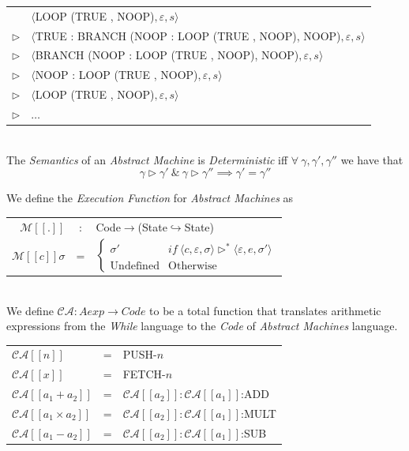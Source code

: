 \documentclass[11pt,a4paper]{article}
\begin{document}
\begin{tabular}{rl}
&$\langle$LOOP (TRUE , NOOP)$,\varepsilon,s\rangle$\\
$\rhd$&$\langle$TRUE : BRANCH (NOOP : LOOP (TRUE , NOOP), NOOP)$,\varepsilon,s\rangle$\\
$\rhd$&$\langle$BRANCH (NOOP : LOOP (TRUE , NOOP), NOOP)$,\varepsilon,s\rangle$\\
$\rhd$&$\langle$NOOP : LOOP (TRUE , NOOP)$,\varepsilon,s\rangle$\\
$\rhd$&$\langle$LOOP (TRUE , NOOP)$,\varepsilon,s\rangle$\\
$\rhd$&$\dots$
\end{tabular}
\\

The \textit{Semantics} of an \textit{Abstract Machine} is \textit{Deterministic} iff $\forall\ \gamma,\gamma',\gamma''$ we have that
$$\gamma\rhd\gamma'\ \&\ \gamma\rhd\gamma''\implies\gamma'=\gamma''$$

We define the \textit{Execution Function} for \textit{Abstract Machines} as\\
\begin{tabular}{rcl}
$\mathcal{M}[[.]]$&:&Code$\to$(State$\hookrightarrow$State)\\
$\mathcal{M}[[c]]\sigma$&=&$\begin{cases}\sigma'& if\ \langle c,\varepsilon,\sigma\rangle\rhd^*\langle\varepsilon,e,\sigma'\rangle\\ \mathrm{Undefined}& \mathrm{Otherwise}\end{cases}$
\end{tabular}
\\

We define $\mathcal{CA}:Aexp\to Code$ to be a total function that translates arithmetic expressions from the \textit{While} language to the \textit{Code} of \textit{Abstract Machines} language.\\
\begin{tabular}{lcl}
$\mathcal{CA}[[n]]$&=&PUSH-$n$\\
$\mathcal{CA}[[x]]$&=&FETCH-$n$\\
$\mathcal{CA}[[a_1+a_2]]$&=&$\mathcal{CA}[[a_2]]:\mathcal{CA}[[a_1]]$:ADD\\
$\mathcal{CA}[[a_1\times a_2]]$&=&$\mathcal{CA}[[a_2]]:\mathcal{CA}[[a_1]]$:MULT\\
$\mathcal{CA}[[a_1-a_2]]$&=&$\mathcal{CA}[[a_2]]:\mathcal{CA}[[a_1]]$:SUB\\
\end{tabular}
\\
\end{document}
